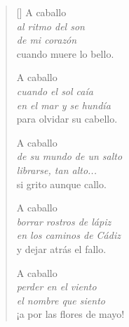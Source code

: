 \documentclass[a4paper,11pt]{article}
\begin{document}

\settowidth{\versewidth}{borrar rostros de lápiz}

\bigskip

\begin{verse}[\versewidth]
  A caballo \\
  \qquad \emph{al ritmo del son} \\
  \qquad \emph{de mi corazón} \\
  cuando muere lo bello.

  A caballo \\
  \qquad \emph{cuando el sol caía} \\
  \qquad \emph{en el mar y se hundía} \\
  para olvidar su cabello.

  A caballo \\
  \qquad \emph{de su mundo de un salto} \\
  \qquad \emph{librarse, tan alto...} \\
  si grito aunque callo.

  A caballo \\
  \qquad \emph{borrar rostros de lápiz} \\
  \qquad \emph{en los caminos de Cádiz} \\
  y dejar atrás el fallo.

  A caballo \\
  \qquad \emph{perder en el viento} \\
  \qquad \emph{el nombre que siento} \\
  ¡a por las flores de mayo!
\end{verse}
\end{document}
